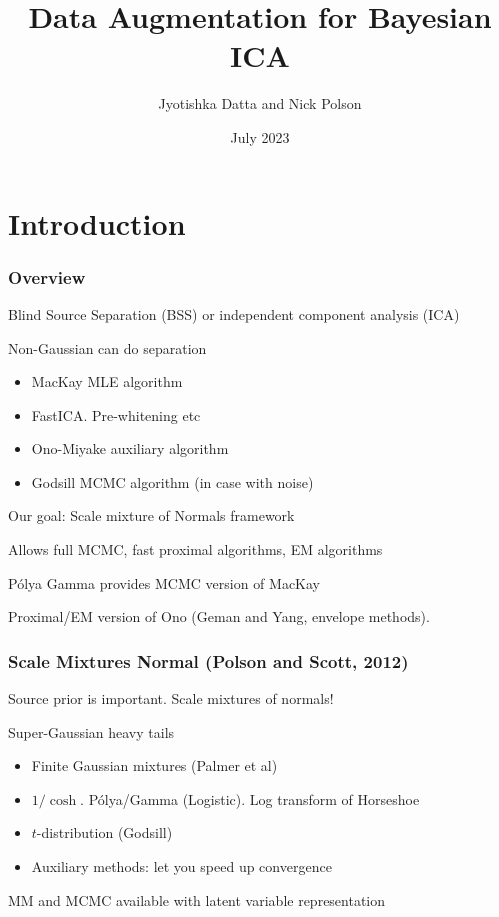 \documentclass{beamer}
\title{Data Augmentation for  Bayesian ICA}
\author{Jyotishka Datta and Nick Polson}
\institute{VT and University of Chicago}
\date{July 2023}
\begin{document}
	
\frame{\titlepage}
	
\section{Introduction}

\begin{frame}
\frametitle{Overview}
\footnotesize

Blind Source Separation (BSS) or independent component analysis (ICA)

Non-Gaussian can do separation

\begin{itemize}
\item MacKay MLE algorithm
\item FastICA. Pre-whitening etc
\item Ono-Miyake  auxiliary algorithm
\item Godsill MCMC algorithm (in case with noise)
\end{itemize}

Our goal: Scale mixture of Normals framework

\vspace{0.1in} 

Allows full MCMC, fast proximal algorithms, EM algorithms

P\'olya Gamma provides MCMC version of MacKay

Proximal/EM version of Ono (Geman and Yang, envelope methods).

\end{frame}
\begin{frame}
\frametitle{Scale Mixtures Normal (Polson and Scott, 2012)}

\footnotesize

Source prior is important. Scale mixtures of normals!  

\vspace{0.1in} 

Super-Gaussian heavy tails 
\begin{itemize}
\item Finite Gaussian mixtures (Palmer et al)
\item $ 1 /\cosh $.  P\'olya/Gamma (Logistic). Log transform of Horseshoe 
\item $t$-distribution (Godsill)
\item Auxiliary methods:  let you speed up convergence 
\end{itemize}

MM and MCMC available with latent variable representation
\end{frame}
\end{document}
